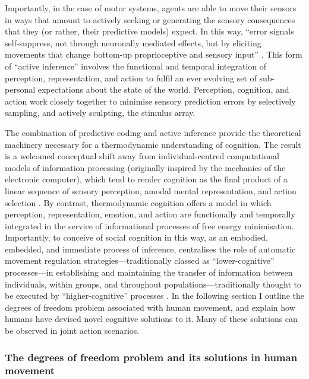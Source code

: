 \begin{CJK}{UTF8}{gbsn}
Importantly, in the case of motor systems, agents are able to move their sensors in ways that amount to actively seeking or generating the sensory consequences that they (or rather, their predictive models) expect.  In this way, ``error signals self-suppress, not through neuronally mediated effects, but by eliciting movements that change bottom-up proprioceptive and sensory input''  \citep[][1349]{Friston2003}.  This form of ``active inference'' involves the functional and temporal integration of perception, representation, and action to fulfil an ever evolving set of sub-personal expectations about the state of the world.  Perception, cognition, and action work closely together to minimise sensory prediction errors by selectively sampling, and actively sculpting, the stimulus array.

The combination of predictive coding and active inference provide the theoretical machinery necessary for a thermodynamic understanding of cognition.  The result is a welcomed conceptual shift away from individual-centred computational models of information processing (originally inspired by the mechanics of the electronic computer), which tend to render cognition as the final product of a linear sequence of sensory perception, amodal mental representation, and action selection \citep{Lewis2005}.  By contrast, thermodynamic cognition offers a model in which perception, representation, emotion, and action are functionally and temporally integrated in the service of informational processes of free energy minimisation.  Importantly,  to conceive of social cognition in this way, as an embodied, embedded, and immediate process of inference, centralises the role of automatic movement regulation strategies---traditionally classed as ``lower-cognitive'' processes---in establishing and maintaining the transfer of information between individuals, within groups, and throughout populations---traditionally thought to be executed by  ``higher-cognitive'' processes \citep{Claidiere2014}.
In the following section I outline the degrees of freedom problem associated with human movement, and explain how humans have devised novel cognitive solutions to it.  Many of these solutions can be observed in joint action scenarios.


\subsubsection{The degrees of freedom problem and its solutions in human movement}


\end{CJK}
